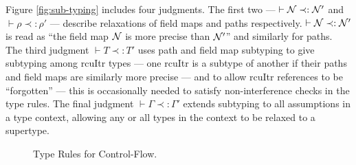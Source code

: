Figure \ref{fig:sub-typing} includes four judgments.  The first two --- $\vdash\mathcal{N}\prec:\mathcal{N}'$ and $\vdash\rho\prec:\rho'$ --- describe relaxations of field maps and paths respectively.  $\vdash\mathcal{N}\prec:\mathcal{N}'$ is read as ``the field map $\mathcal{N}$ is more precise than $\mathcal{N}'$'' and similarly for paths.
The third judgment $\vdash T\prec:T'$ uses path and field map subtyping to give subtyping among \textsf{rcuItr} types --- one \textsf{rcuItr} is a subtype of another if their paths and field maps are similarly more precise --- and to allow \textsf{rcuItr} references to be ``forgotten'' --- this is occasionally needed to satisfy non-interference checks in the type rules.
The final judgment $\vdash\Gamma\prec:\Gamma'$ extends subtyping to all assumptions in a type context, allowing any or all types in the context to be relaxed to a supertype.
\begin{figure}[!t]\scriptsize
\begin{mdframed}
\vspace{-2em}
\caption{Type Rules for Control-Flow.}
\label{fig:type-judgements-for-cf}
\end{mdframed}
\end{figure}

